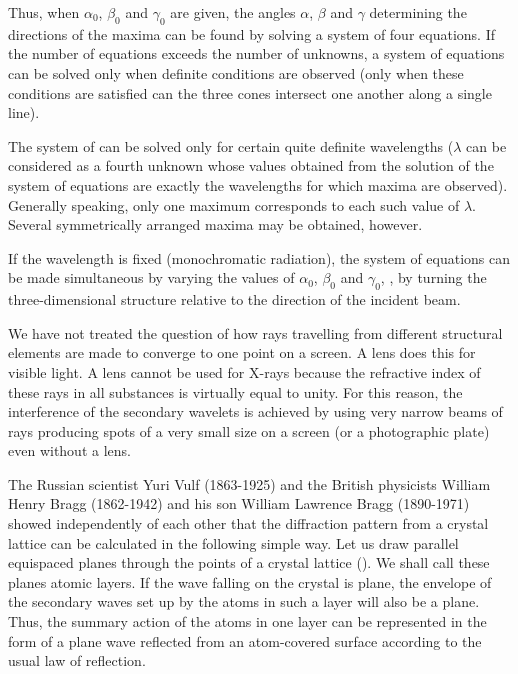 \noindent
Thus, when $\alpha_0$, $\beta_0$ and $\gamma_0$ are given, the angles $\alpha$, $\beta$ and $\gamma$ determining the directions of the maxima can be found by solving a system of four
equations.
If the number of equations exceeds the number of unknowns, a system of equations can be solved only when definite conditions are observed (only when these conditions are satisfied can the three cones intersect one another along a single line).

The system of  can be solved only for certain quite definite wavelengths ($\lambda$ can be considered as a fourth unknown whose values obtained from the solution of the system of equations are exactly the wavelengths for which maxima are observed).
Generally speaking, only one maximum corresponds to each such value of $\lambda$.
Several symmetrically arranged maxima may be obtained, however.

If the wavelength is fixed (monochromatic radiation), the system of equations can be made simultaneous by varying the values of $\alpha_0$, $\beta_0$ and $\gamma_0$, \ie, by turning the three-dimensional structure relative
to the direction of the incident beam.

We have not treated the question of how rays travelling from different structural elements are made to converge to one point on a screen.
A lens does this for visible light.
A lens cannot be used for X-rays because the refractive index of these rays in all substances
is virtually equal to unity.
For this reason, the interference of the secondary wavelets is achieved by using very narrow beams of rays producing spots of a very small size on a screen (or a photographic plate) even without a lens.

The Russian scientist Yuri Vulf (1863-1925) and the British physicists William Henry Bragg (1862-1942) and his son William Lawrence Bragg (1890-1971) showed independently of each other that the diffraction pattern from a crystal lattice can be calculated in the following simple way. Let us draw parallel equispaced planes through the points of a crystal lattice ().
We shall call these planes atomic layers.
If the wave falling on the crystal is plane, the envelope of the secondary waves set up by the atoms in such a layer will also be a plane.
Thus, the summary action of the atoms in one layer can be represented in the form of a plane wave reflected from an atom-covered surface according to the usual law of reflection.

